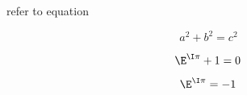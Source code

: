 
refer to equation 

\begin{equation}\label{eq_test2_1}
a^2+b^2=c^2~
\end{equation}

\begin{equation}\label{eq_test2_2}
\E^{\I \pi}+1=0~
\end{equation}

\begin{equation}\label{eq_test2_3}
\E^{\I \pi}=-1~
\end{equation}

